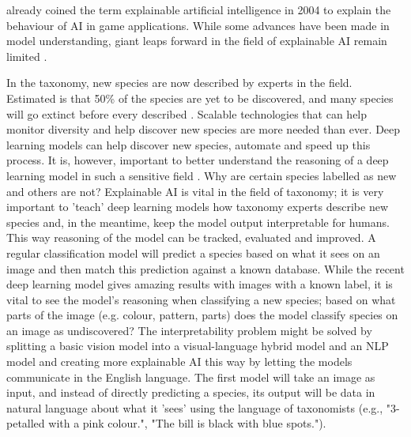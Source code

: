 \documentclass{article}
\begin{document}
\textcite{van_lent_explainable_2004} already coined the term explainable artificial intelligence in 2004 to explain the behaviour of AI in game applications.
While some advances have been made in model understanding, giant leaps forward in the field of explainable AI remain limited \autocite{lipton_mythos_2017, li_interpretable_2021}.

In the taxonomy, new species are now described by experts in the field.
Estimated is that 50\% of the species are yet to be discovered, and many species will go extinct before every described \autocite{lees_species_2015}.
Scalable technologies that can help monitor diversity and help discover new species are more needed than ever.
Deep learning models can help discover new species, automate and speed up this process.
It is, however, important to better understand the reasoning of a deep learning model in such a sensitive field \autocite{carvalho_machine_2019}.
Why are certain species labelled as new and others are not?
Explainable AI is vital in the field of taxonomy; it is very important to 'teach' deep learning models how taxonomy experts describe new species and, in the meantime, keep the model output interpretable for humans.
This way reasoning of the model can be tracked, evaluated and improved.
A regular classification model will predict a species based on what it sees on an image and then match this prediction against a known database.
While the recent deep learning model gives amazing results with images with a known label, it is vital to see the model's reasoning when classifying a new species; based on what parts of the image (e.g. colour, pattern, parts) does the model classify species on an image as undiscovered?
The interpretability problem might be solved by splitting a basic vision model into a visual-language hybrid model and an NLP model and creating more explainable AI this way by letting the models communicate in the English language.
The first model will take an image as input, and instead of directly predicting a species, its output will be data in natural language about what it 'sees' using the language of taxonomists (e.g., "3-petalled with a pink colour.", "The bill is black with blue spots.").
\end{document}
